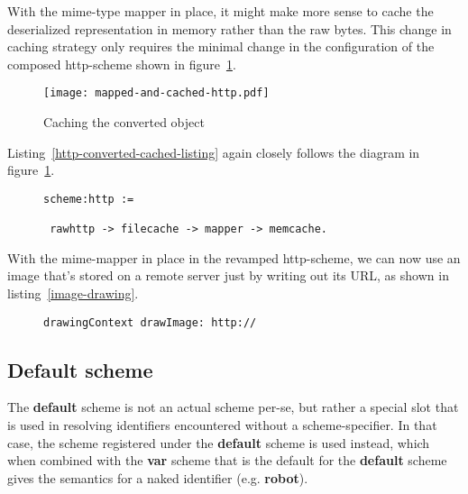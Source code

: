 \documentclass[preprint,authoryear]{acm_proc_article-sp}
\begin{document}
With the mime-type mapper in place, it might make more sense to
cache the deserialized representation in memory rather than
the raw bytes.  This change in caching strategy only requires
the minimal change in the configuration of the composed http-scheme
shown in figure~\ref{http-converted-cached}.

\begin{figure}[htbp]
\caption{Caching the converted object}
\label{http-converted-cached}
\begin{center}
\texttt{[image: mapped-and-cached-http.pdf]}
\end{center}
\end{figure}

Listing~\ref{http-converted-cached-listing} again closely follows the
diagram in figure~\ref{http-converted-cached}.

\begin{figure}[htbp]
\begin{lstlisting}[style=L,label=http-converted-cached-listing,caption=Converting and caching.]
scheme:http := 

 rawhttp -> filecache -> mapper -> memcache.
\end{lstlisting}
\end{figure}

With the mime-mapper in place in the revamped http-scheme, we can now use 
an image that's stored on a remote server just by writing out its URL, as shown
in listing~\ref{image-drawing}.

\begin{figure}[htbp]
\begin{lstlisting}[style=L,label=image-drawing,caption=Drawing a remote image.]
drawingContext drawImage: http://
\end{lstlisting}
\end{figure}



\subsection{Default scheme}


The {\bf default} scheme is not an actual scheme per-se, but rather a special slot
that is used in resolving identifiers encountered without a scheme-specifier.
In that case, the scheme registered under the {\bf default} scheme is used
instead, which when combined with the {\bf var} scheme that is the default
for the {\bf default} scheme gives the semantics for a naked identifier (e.g. {\bf robot}).
\end{document}
